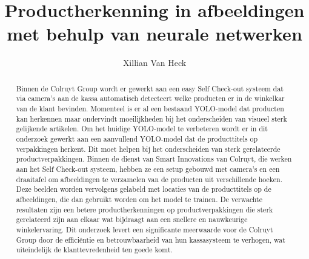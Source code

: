 \documentclass{hogent-article}
\title{Productherkenning in afbeeldingen met behulp van neurale netwerken}
\author{Xillian Van Heck}
\begin{document}
\begin{abstract}
  Binnen de Colruyt Group wordt er gewerkt aan een easy Self Check-out systeem dat via camera’s aan de kassa automatisch detecteert welke producten er in de winkelkar van de klant bevinden.
  Momenteel is er al een bestaand YOLO-model dat producten kan herkennen maar ondervindt moeilijkheden bij het onderscheiden van visueel sterk gelijkende artikelen.
  Om het huidige YOLO-model te verbeteren wordt er in dit onderzoek gewerkt aan een aanvullend YOLO-model dat de producttitels op verpakkingen herkent.
  Dit moet helpen bij het onderscheiden van sterk gerelateerde productverpakkingen. Binnen de dienst van Smart Innovations van Colruyt, die werken aan het Self Check-out systeem, 
  hebben ze een setup gebouwd met camera’s en een draaitafel om afbeeldingen te verzamelen van de producten uit verschillende hoeken. 
  Deze beelden worden vervolgens gelabeld met locaties van de producttitels op de afbeeldingen, die dan gebruikt worden om het model te trainen. 
  De verwachte resultaten zijn een betere productherkenningen op productverpakkingen die sterk gerelateerd zijn aan elkaar wat bijdraagt aan een snellere en nauwkeurige winkelervaring. 
  Dit onderzoek levert een significante meerwaarde voor de Colruyt Group door de efficiëntie en betrouwbaarheid van hun kassasysteem te verhogen, wat uiteindelijk de klanttevredenheid ten goede komt.
\end{abstract}

\tableofcontents



\printbibliography[heading=bibintoc]
\end{document}
